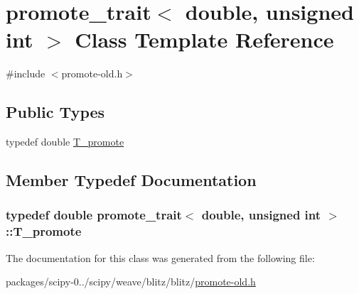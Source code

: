 \hypertarget{classpromote__trait_3_01double_00_01unsigned_01int_01_4}{}\section{promote\+\_\+trait$<$ double, unsigned int $>$ Class Template Reference}
\label{classpromote__trait_3_01double_00_01unsigned_01int_01_4}


{\ttfamily \#include $<$promote-\/old.\+h$>$}

\subsection*{Public Types}
\begin{DoxyCompactItemize}
\item 
typedef double \hyperlink{classpromote__trait_3_01double_00_01unsigned_01int_01_4_a2f2abe0c189244cfaf4214a44c28f071}{T\+\_\+promote}
\end{DoxyCompactItemize}


\subsection{Member Typedef Documentation}
\hypertarget{classpromote__trait_3_01double_00_01unsigned_01int_01_4_a2f2abe0c189244cfaf4214a44c28f071}{}
\subsubsection[{T\+\_\+promote}]{\setlength{\rightskip}{0pt plus 5cm}typedef double {\bf promote\+\_\+trait}$<$ double, unsigned int $>$\+::{\bf T\+\_\+promote}}\label{classpromote__trait_3_01double_00_01unsigned_01int_01_4_a2f2abe0c189244cfaf4214a44c28f071}


The documentation for this class was generated from the following file\+:\begin{DoxyCompactItemize}
\item 
packages/scipy-\/0../scipy/weave/blitz/blitz/\hyperlink{promote-old_8h}{promote-\/old.\+h}\end{DoxyCompactItemize}
